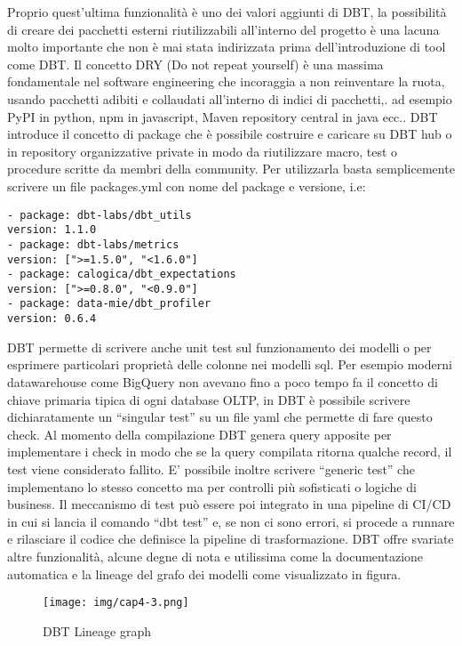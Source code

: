 \documentclass[a4paper,12pt]{report}
\begin{document}
\noindent
Proprio quest’ultima funzionalità è uno dei valori aggiunti di DBT, la possibilità di creare dei pacchetti esterni riutilizzabili all’interno del progetto è una lacuna molto importante che non è mai stata indirizzata prima dell’introduzione di tool come DBT. Il concetto  DRY (Do not repeat yourself) è una massima fondamentale nel software engineering che incoraggia a non reinventare la ruota, usando pacchetti adibiti e collaudati all’interno di indici di pacchetti,. ad esempio PyPI in python, npm in javascript, Maven repository central in java ecc..
\noindent
DBT introduce il concetto di package che è possibile costruire e caricare su DBT hub o in repository organizzative private in modo da riutilizzare macro, test o procedure scritte da membri della community. Per utilizzarla basta semplicemente scrivere un file packages.yml
con nome del package e versione, i.e:
\begin{verbatim}
- package: dbt-labs/dbt_utils
version: 1.1.0
- package: dbt-labs/metrics
version: [">=1.5.0", "<1.6.0"]
- package: calogica/dbt_expectations
version: [">=0.8.0", "<0.9.0"]
- package: data-mie/dbt_profiler
version: 0.6.4
\end{verbatim}

\noindent
DBT permette di scrivere anche unit test sul funzionamento dei modelli o per esprimere particolari proprietà delle colonne nei modelli sql.
Per esempio moderni datawarehouse come BigQuery non avevano fino a poco tempo fa il concetto di chiave primaria tipica di ogni database OLTP, in DBT è possibile scrivere dichiaratamente un “singular test” su un file yaml che permette di fare questo check.
Al momento della compilazione DBT genera query apposite per implementare i check in modo che se la query compilata ritorna qualche record, il test viene considerato fallito.
E’ possibile inoltre  scrivere “generic test” che implementano lo stesso concetto ma per controlli più sofisticati o logiche di business. 
Il meccanismo di test può essere poi integrato in una pipeline di CI/CD in cui si lancia il comando “dbt test” e, se non ci sono errori, si procede a runnare e rilasciare il codice che definisce la pipeline di trasformazione.
DBT offre svariate altre funzionalità, alcune degne di nota e utilissima come la documentazione automatica e la lineage del grafo dei modelli come visualizzato in figura.

\begin{figure}[h]
    \centering
    \texttt{[image: img/cap4-3.png]}
    \caption{DBT Lineage graph}
\end{figure}
\end{document}
